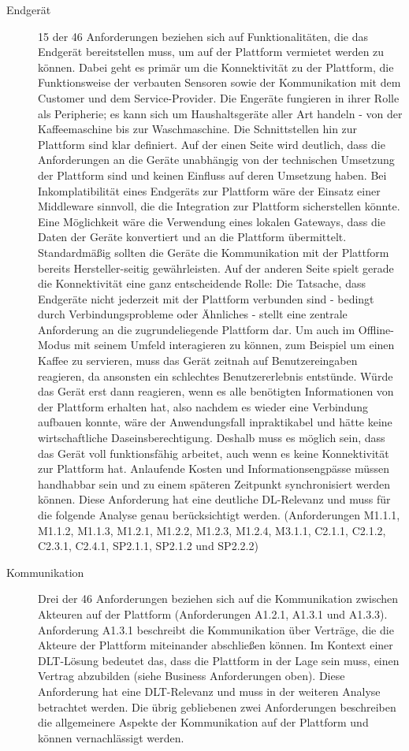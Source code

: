 \begin{description}
  \item[Endgerät] 15 der 46 Anforderungen beziehen sich auf Funktionalitäten, die das Endgerät bereitstellen muss, um auf der Plattform vermietet werden zu können. Dabei geht es primär um die Konnektivität zu der Plattform, die Funktionsweise der verbauten Sensoren sowie der Kommunikation mit dem Customer und dem Service-Provider. Die Engeräte fungieren in ihrer Rolle als Peripherie; es kann sich um Haushaltsgeräte aller Art handeln - von der Kaffeemaschine bis zur Waschmaschine. Die Schnittstellen hin zur Plattform sind klar definiert. Auf der einen Seite wird deutlich, dass die Anforderungen an die Geräte unabhängig von der technischen Umsetzung der Plattform sind und keinen Einfluss auf deren Umsetzung haben. Bei Inkomplatibilität eines Endgeräts zur Plattform wäre der Einsatz einer Middleware sinnvoll, die die Integration zur Plattform sicherstellen könnte. Eine Möglichkeit wäre die Verwendung eines lokalen Gateways, dass die Daten der Geräte konvertiert und an die Plattform übermittelt. Standardmäßig sollten die Geräte die Kommunikation mit der Plattform bereits Hersteller-seitig gewährleisten. Auf der anderen Seite spielt gerade die Konnektivität eine ganz entscheidende Rolle: Die Tatsache, dass Endgeräte nicht jederzeit mit der Plattform verbunden sind - bedingt durch Verbindungsprobleme oder Ähnliches - stellt eine zentrale Anforderung an die zugrundeliegende Plattform dar. Um auch im Offline-Modus mit seinem Umfeld interagieren zu können, zum Beispiel um einen Kaffee zu servieren, muss das Gerät zeitnah auf Benutzereingaben reagieren, da ansonsten ein schlechtes Benutzererlebnis entstünde. Würde das Gerät erst dann reagieren, wenn es alle benötigten Informationen von der Plattform erhalten hat, also nachdem es wieder eine Verbindung aufbauen konnte, wäre der Anwendungsfall inpraktikabel und hätte keine wirtschaftliche Daseinsberechtigung. Deshalb muss es möglich sein, dass das Gerät voll funktionsfähig arbeitet, auch wenn es keine Konnektivität zur Plattform hat. Anlaufende Kosten und Informationsengpässe müssen handhabbar sein und zu einem späteren Zeitpunkt synchronisiert werden können. Diese Anforderung hat eine deutliche \ac{DL}-Relevanz und muss für die folgende Analyse genau berücksichtigt werden. (Anforderungen M1.1.1, M1.1.2, M1.1.3, M1.2.1, M1.2.2, M1.2.3, M1.2.4, M3.1.1, C2.1.1, C2.1.2, C2.3.1, C2.4.1, SP2.1.1, SP2.1.2 und SP2.2.2)
  \item[Kommunikation] Drei der 46 Anforderungen beziehen sich auf die Kommunikation zwischen Akteuren auf der Plattform (Anforderungen A1.2.1, A1.3.1 und A1.3.3). Anforderung A1.3.1 beschreibt die Kommunikation über Verträge, die die Akteure der Plattform miteinander abschließen können. Im Kontext einer \ac{DLT}-Lösung bedeutet das, dass die Plattform in der Lage sein muss, einen Vertrag abzubilden (siehe Business Anforderungen oben). Diese Anforderung hat eine \ac{DLT}-Relevanz und muss in der weiteren Analyse betrachtet werden. Die übrig gebliebenen zwei Anforderungen beschreiben die allgemeinere Aspekte der Kommunikation auf der Plattform und können vernachlässigt werden.

\end{description}
